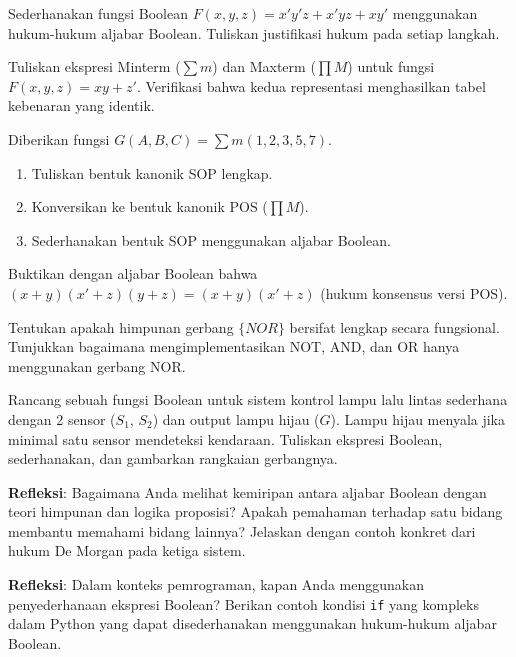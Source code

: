 \documentclass[../main]{subfiles}
\begin{document}

\begin{latihan}
  \item Sederhanakan fungsi Boolean $F(x, y, z) = x'y'z + x'yz + xy'$ menggunakan hukum-hukum aljabar Boolean. Tuliskan justifikasi hukum pada setiap langkah.
  \item Tuliskan ekspresi Minterm ($\sum m$) dan Maxterm ($\prod M$) untuk fungsi $F(x, y, z) = xy + z'$. Verifikasi bahwa kedua representasi menghasilkan tabel kebenaran yang identik.
  \item Diberikan fungsi $G(A, B, C) = \sum m(1, 2, 3, 5, 7)$.
  \begin{enumerate}
    \item Tuliskan bentuk kanonik SOP lengkap.
    \item Konversikan ke bentuk kanonik POS ($\prod M$).
    \item Sederhanakan bentuk SOP menggunakan aljabar Boolean.
  \end{enumerate}
  \item Buktikan dengan aljabar Boolean bahwa $(x + y)(x' + z)(y + z) = (x + y)(x' + z)$ (hukum konsensus versi POS).
  \item Tentukan apakah himpunan gerbang $\{NOR\}$ bersifat lengkap secara fungsional. Tunjukkan bagaimana mengimplementasikan NOT, AND, dan OR hanya menggunakan gerbang NOR.
  \item Rancang sebuah fungsi Boolean untuk sistem kontrol lampu lalu lintas sederhana dengan 2 sensor ($S_1$, $S_2$) dan output lampu hijau ($G$). Lampu hijau menyala jika minimal satu sensor mendeteksi kendaraan. Tuliskan ekspresi Boolean, sederhanakan, dan gambarkan rangkaian gerbangnya.
  \item \textbf{Refleksi}: Bagaimana Anda melihat kemiripan antara aljabar Boolean dengan teori himpunan dan logika proposisi? Apakah pemahaman terhadap satu bidang membantu memahami bidang lainnya? Jelaskan dengan contoh konkret dari hukum De Morgan pada ketiga sistem.
  \item \textbf{Refleksi}: Dalam konteks pemrograman, kapan Anda menggunakan penyederhanaan ekspresi Boolean? Berikan contoh kondisi \texttt{if} yang kompleks dalam Python yang dapat disederhanakan menggunakan hukum-hukum aljabar Boolean.
\end{latihan}

\end{document}
